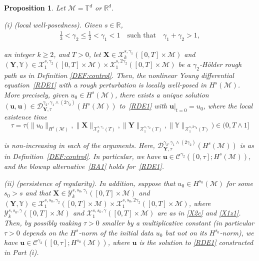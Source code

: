 \documentclass[letterpaper, 11pt,  reqno]{amsart}
\newtheorem{proposition}[theorem]{Proposition}
\newcommand{\1}{\hspace{0.5mm}\textup{I}\hspace{0.5mm}}
\newcommand{\noi}{\noindent}
\newcommand{\R}{\mathbb{R}}
\newcommand{\T}{\mathbb{T}}
\newcommand{\D}{\mathcal{D}}
\newcommand{\g}{\gamma}
\newcommand{\M}{\mathcal{M}}
\newcommand{\cC}{\mathcal{C}}
\newcommand{\cX}{\mathcal{X}}
\newcommand{\cY}{\mathcal{Y}}
\newcommand{\uu}{\mathbf{u}}
\newcommand{\YYb}{\mathbb{Y}}
\newcommand{\XX}{\mathbf{X}}
\newcommand{\YY}{\mathbf{Y}}
\numberwithin{equation}{section}
\numberwithin{theorem}{section}
\begin{document}
\begin{proposition}
\label{PROP:main2}
Let $\M = \T^d$ or $\R^d$.

\smallskip

\noi
\textup{(i) (local well-posedness).}
Given   $s \in \R$, 
\begin{align*}
\frac 13  < \g_2 \le \frac 12 < \g_1  < 1
\quad \text{such that}  \quad \g_1 + \g_2 > 1, 
\end{align*}

\noi
an integer $k \ge 2$, and $T > 0$, 
let     $\XX \in \cX^{s, \g_1}_k([0, T]\times \M)$
and 
$(\YY, \YYb) \in \cX^{s, \g_2}_1([0, T]\times \M)
\times \cX^{s, 2\g_2}_1([0, T]\times \M)$
be a $\g_2$-H\"older rough path
as in Definition \ref{DEF:control}.
Then, 
 the nonlinear Young differential equation~\eqref{RDE1} with 
 a rough perturbation
is locally well-posed in $H^s(\M)$.
More precisely, given $u_0 \in H^s(\M)$, 
there exists a unique solution $(\uu, \uu)
\in 
\D^{\g_2, \g_1 \wedge (2\g_2)}_{\YY, \tau}(H^s(\M))$
to~\eqref{RDE1}
with $\uu|_{t = 0} = u_0$, 
where 
the local existence time 
\[\tau = 
\tau\Big(\|u_0\|_{H^s(\M)}, \|\XX\|_{\cX^{s, \g_1}_k(T)},
\|\YY\|_{\cX^{s, \g_2}_1(T)},  \|\YYb\|_{\cX^{s, 2\g_2}_1(T)}\Big) \in (0, T\wedge 1]\]

\noi
is non-increasing in each of the arguments.
Here, 
$\D^{\g_2, \g_1 \wedge (2\g_2)}_{\YY, \tau}(H^s(\M))$
is as in Definition~\ref{DEF:control}.
In particular, we have
 $\uu \in \cC^{\g_2} ([0, \tau]; H^{s}(\M))$, 
 and 
the blowup alternative~\eqref{BA1} holds
for~\eqref{RDE1}.





\smallskip

\noi
\textup{(ii) (persistence of regularity).}
In addition, suppose that $u_0 \in H^{s_0}(\M)$ for some $s_0 > s$
and that  $\XX \in \cY^{s, s_0, \g_1}_k([0, T]\times \M)$
and $(\YY, \YYb)  \in \cX^{s, s_0, \g_2}_1([0, T]\times \M)
\times \cX^{s, s_0, 2\g_2}_1([0, T]\times \M)$, 
where $\cY^{s, s_0, \g}_k([0, T]\times \M)$  
and 
 $\cX^{s, s_0, \g}_1([0, T]\times \M)$  
 are as in \eqref{X2c}
and 
\eqref{X1z1}.
Then, 
by possibly making $\tau > 0$ smaller by a multiplicative constant 
\textup{(}in particular $\tau > 0$
depends on the $H^s$-norm of the initial data $u_0$
but not on its $H^{s_0}$-norm\textup{)}, 
we have $\uu \in \cC^{\g_2} ([0, \tau]; H^{s_0}(\M))$, 
 where $\uu$ is the solution to \eqref{RDE1}
 constructed in Part (i).







\end{proposition}
\end{document}
